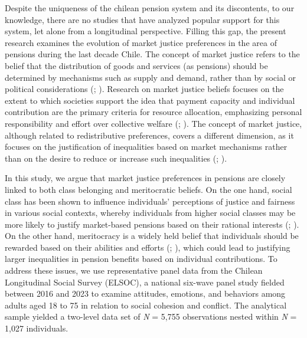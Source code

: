 \documentclass[
  12pt,
]{article}
\begin{document}
Despite the uniqueness of the chilean pension system and its
discontents, to our knowledge, there are no studies that have analyzed
popular support for this system, let alone from a longitudinal
perspective. Filling this gap, the present research examines the
evolution of market justice preferences in the area of pensions during
the last decade Chile. The concept of market justice refers to the
belief that the distribution of goods and services (as pensions) should
be determined by mechanisms such as supply and demand, rather than by
social or political considerations
(;
). Research on market
justice beliefs focuses on the extent to which societies support the
idea that payment capacity and individual contribution are the primary
criteria for resource allocation, emphasizing personal responsibility
and effort over collective welfare
(;
). The
concept of market justice, although related to redistributive
preferences, covers a different dimension, as it focuses on the
justification of inequalities based on market mechanisms rather than on
the desire to reduce or increase such inequalities
(;
).

In this study, we argue that market justice preferences in pensions are
closely linked to both class belonging and meritocratic beliefs. On the
one hand, social class has been shown to influence individuals'
perceptions of justice and fairness in various social contexts, whereby
individuals from higher social classes may be more likely to justify
market-based pensions based on their rational interests
(;
). On the other
hand, meritocracy is a widely held belief that individuals should be
rewarded based on their abilities and efforts
(;
), which could lead to
justifying larger inequalities in pension benefits based on individual
contributions. To address these issues, we use representative panel data
from the Chilean Longitudinal Social Survey (ELSOC), a national six-wave
panel study fielded between 2016 and 2023 to examine attitudes,
emotions, and behaviors among adults aged 18 to 75 in relation to social
cohesion and conflict. The analytical sample yielded a two-level data
set of \emph{N} = 5,755 observations nested within \emph{N} = 1,027
individuals.
\end{document}
